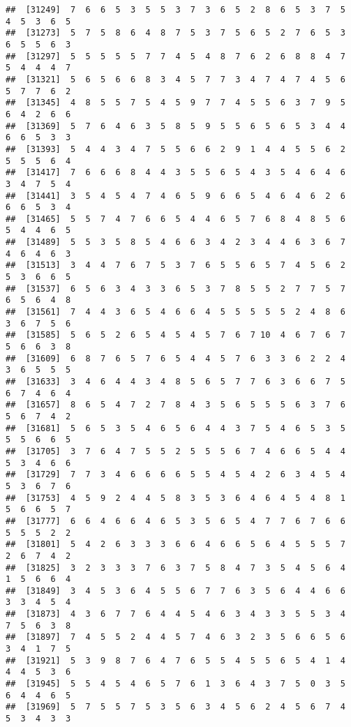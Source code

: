 \documentclass[
]{book}
\begin{document}
\begin{verbatim}
##  [31249]  7  6  6  5  3  5  5  3  7  3  6  5  2  8  6  5  3  7  5  4  5  3  6  5
##  [31273]  5  7  5  8  6  4  8  7  5  3  7  5  6  5  2  7  6  5  3  6  5  5  6  3
##  [31297]  5  5  5  5  5  7  7  4  5  4  8  7  6  2  6  8  8  4  7  5  4  4  4  7
##  [31321]  5  6  5  6  6  8  3  4  5  7  7  3  4  7  4  7  4  5  6  5  7  7  6  2
##  [31345]  4  8  5  5  7  5  4  5  9  7  7  4  5  5  6  3  7  9  5  6  4  2  6  6
##  [31369]  5  7  6  4  6  3  5  8  5  9  5  5  6  5  6  5  3  4  4  6  6  5  3  3
##  [31393]  5  4  4  3  4  7  5  5  6  6  2  9  1  4  4  5  5  6  2  5  5  5  6  4
##  [31417]  7  6  6  6  8  4  4  3  5  5  6  5  4  3  5  4  6  4  6  3  4  7  5  4
##  [31441]  3  5  4  5  4  7  4  6  5  9  6  6  5  4  6  4  6  2  6  6  6  5  3  4
##  [31465]  5  5  7  4  7  6  6  5  4  4  6  5  7  6  8  4  8  5  6  5  4  4  6  5
##  [31489]  5  5  3  5  8  5  4  6  6  3  4  2  3  4  4  6  3  6  7  4  6  4  6  3
##  [31513]  3  4  4  7  6  7  5  3  7  6  5  5  6  5  7  4  5  6  2  5  3  6  6  5
##  [31537]  6  5  6  3  4  3  3  6  5  3  7  8  5  5  2  7  7  5  7  6  5  6  4  8
##  [31561]  7  4  4  3  6  5  4  6  6  4  5  5  5  5  5  2  4  8  6  3  6  7  5  6
##  [31585]  5  6  5  2  6  5  4  5  4  5  7  6  7 10  4  6  7  6  7  5  6  6  3  8
##  [31609]  6  8  7  6  5  7  6  5  4  4  5  7  6  3  3  6  2  2  4  3  6  5  5  5
##  [31633]  3  4  6  4  4  3  4  8  5  6  5  7  7  6  3  6  6  7  5  6  7  4  6  4
##  [31657]  8  6  5  4  7  2  7  8  4  3  5  6  5  5  5  6  3  7  6  5  6  7  4  2
##  [31681]  5  6  5  3  5  4  6  5  6  4  4  3  7  5  4  6  5  3  5  5  5  6  6  5
##  [31705]  3  7  6  4  7  5  5  2  5  5  5  6  7  4  6  6  5  4  4  5  3  4  6  6
##  [31729]  7  7  3  4  6  6  6  6  5  5  4  5  4  2  6  3  4  5  4  5  3  6  7  6
##  [31753]  4  5  9  2  4  4  5  8  3  5  3  6  4  6  4  5  4  8  1  5  6  6  5  7
##  [31777]  6  6  4  6  6  4  6  5  3  5  6  5  4  7  7  6  7  6  6  5  5  5  2  2
##  [31801]  5  4  2  6  3  3  3  6  6  4  6  6  5  6  4  5  5  5  7  2  6  7  4  2
##  [31825]  3  2  3  3  3  7  6  3  7  5  8  4  7  3  5  4  5  6  4  1  5  6  6  4
##  [31849]  3  4  5  3  6  4  5  5  6  7  7  6  3  5  6  4  4  6  6  3  3  4  5  4
##  [31873]  4  3  6  7  7  6  4  4  5  4  6  3  4  3  3  5  5  3  4  7  5  6  3  8
##  [31897]  7  4  5  5  2  4  4  5  7  4  6  3  2  3  5  6  6  5  6  3  4  1  7  5
##  [31921]  5  3  9  8  7  6  4  7  6  5  5  4  5  5  6  5  4  1  4  4  4  5  3  6
##  [31945]  5  5  4  5  4  6  5  7  6  1  3  6  4  3  7  5  0  3  5  6  4  4  6  5
##  [31969]  5  7  5  5  7  5  3  5  6  3  4  5  6  2  4  5  6  7  4  5  3  4  3  3

\end{verbatim}
\end{document}
